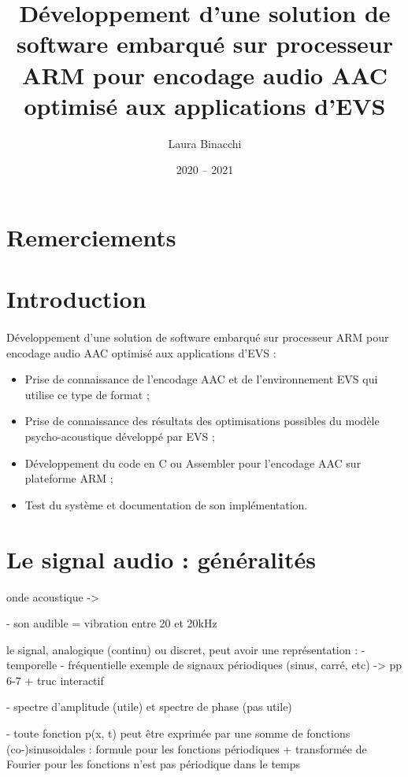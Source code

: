 \documentclass{article}
\title{Développement d'une solution de software embarqué sur processeur ARM pour encodage audio AAC optimisé aux applications d'EVS}
\date{2020 -- 2021}
\author{Laura Binacchi}
\begin{document}
    
    \newpage
    \tableofcontents
    \newpage

    \section*{Remerciements}
    \paragraph{}

    \section*{Introduction}
    \paragraph{}
    Développement d'une solution de software embarqué sur processeur ARM pour encodage audio AAC optimisé aux applications d'EVS :
    \begin{itemize}
        \item Prise de connaissance de l'encodage AAC et de l'environnement EVS qui utilise ce type de format ;
        \item Prise de connaissance des résultats des optimisations possibles du modèle psycho-acoustique développé par EVS ;
        \item Développement du code en C ou Assembler pour l'encodage AAC sur plateforme ARM ;
        \item Test du système et documentation de son implémentation.
    \end{itemize}

    \section{Le signal audio : généralités}

    onde acoustique -> 

    - son audible = vibration entre 20 et 20kHz

    le signal, analogique (continu) ou discret, peut avoir une représentation :
    - temporelle
    - fréquentielle
    exemple de signaux périodiques (sinus, carré, etc) -> pp 6-7 + truc interactif

    - spectre d'amplitude (utile) et spectre de phase (pas utile)

    - toute fonction p(x, t) peut être exprimée par une somme de fonctions (co-)sinusoidales : formule pour les fonctions périodiques + transformée de Fourier pour les fonctions n'est pas périodique dans le temps
\end{document}
